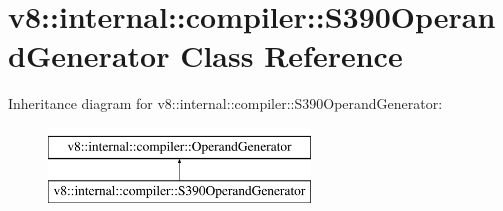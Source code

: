 \hypertarget{classv8_1_1internal_1_1compiler_1_1S390OperandGenerator}{}\section{v8\+:\+:internal\+:\+:compiler\+:\+:S390\+Operand\+Generator Class Reference}
\label{classv8_1_1internal_1_1compiler_1_1S390OperandGenerator}
Inheritance diagram for v8\+:\+:internal\+:\+:compiler\+:\+:S390\+Operand\+Generator\+:\begin{figure}[H]
\begin{center}
\leavevmode
\includegraphics[height=2.000000cm]{classv8_1_1internal_1_1compiler_1_1S390OperandGenerator}
\end{center}
\end{figure}
